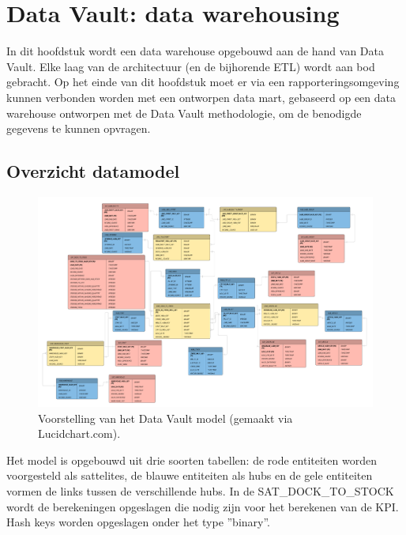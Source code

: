 
\chapter{Data Vault: data warehousing}
\label{ch:dvmodel}
In dit hoofdstuk wordt een data warehouse opgebouwd aan de hand van Data Vault. Elke laag van de architectuur (en de bijhorende ETL) wordt aan bod gebracht. Op het einde van dit hoofdstuk moet er via een rapporteringsomgeving kunnen verbonden worden met een ontworpen data mart, gebaseerd op een data warehouse ontworpen met de Data Vault methodologie, om de benodigde gegevens te kunnen opvragen.

\newpage
\section{Overzicht datamodel}
\begin{figure}[h]
	\centering
	\includegraphics[scale=0.34]{../images/DataVaultModel.png}
	\caption{Voorstelling van het Data Vault model (gemaakt via Lucidchart.com).}
	\label{fig:dvm}
\end{figure}

Het model is opgebouwd uit drie soorten tabellen: de rode entiteiten worden voorgesteld als sattelites, de blauwe entiteiten als hubs en de gele entiteiten vormen de links tussen de verschillende hubs. In de SAT\_DOCK\_TO\_STOCK wordt de berekeningen opgeslagen die nodig zijn voor het berekenen van de KPI. Hash keys worden opgeslagen onder het type ''binary''.

